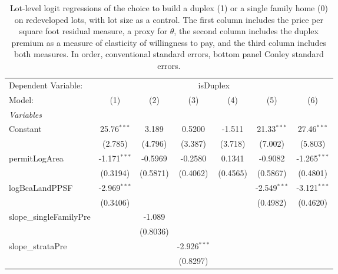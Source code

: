 \documentclass[12pt]{article}
\begin{document}
\begin{table}
	\caption{\label{tab:horseRace} Lot-level logit regressions of the choice to build a duplex (1) or a single family home (0) on redeveloped lots, with lot size as a control. The first column includes the price per square foot residual measure, a proxy for $\theta$, the second column includes the duplex premium as a measure of elasticity of willingness to pay, and the third column includes both measures. In order, conventional standard errors, bottom panel Conley standard errors.}



\begingroup
\centering
\begin{tabular}{lcccccc}
   \tabularnewline \midrule \midrule
   Dependent Variable: & \multicolumn{6}{c}{isDuplex}\\
   Model:                  & (1)            & (2)      & (3)            & (4)           & (5)            & (6)\\  
   \midrule
   \emph{Variables}\\
   Constant                & 25.76$^{***}$  & 3.189    & 0.5200         & -1.511        & 21.33$^{***}$  & 27.46$^{***}$\\   
                           & (2.785)        & (4.796)  & (3.387)        & (3.718)       & (7.002)        & (5.803)\\   
   permitLogArea           & -1.171$^{***}$ & -0.5969  & -0.2580        & 0.1341        & -0.9082        & -1.265$^{***}$\\   
                           & (0.3194)       & (0.5871) & (0.4062)       & (0.4565)      & (0.5867)       & (0.4801)\\   
   logBcaLandPPSF          & -2.969$^{***}$ &          &                &               & -2.549$^{***}$ & -3.121$^{***}$\\   
                           & (0.3406)       &          &                &               & (0.4982)       & (0.4620)\\   
   slope\_singleFamilyPre  &                & -1.089   &                &               &                &   \\   
                           &                & (0.8036) &                &               &                &   \\   
   slope\_strataPre        &                &          & -2.926$^{***}$ &               &                &   \\   
                           &                &          & (0.8297)       &               &                &   \\   

\end{tabular}
\end{table}
\end{document}
